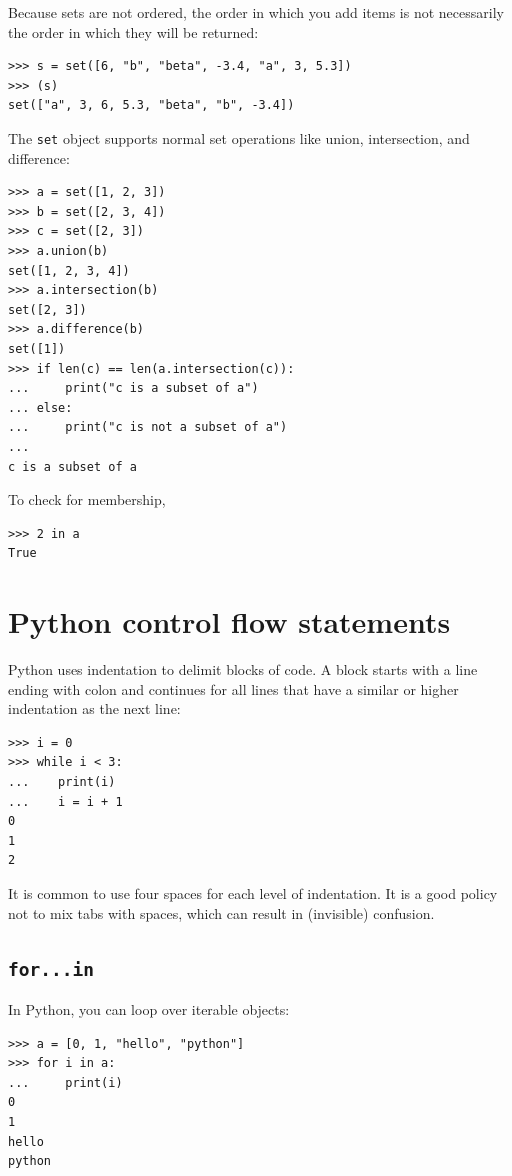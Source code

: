 \documentclass[justified, sixbynine]{tufte-book}
\def\ft{\small\tt}
\theoremstyle{plain}%
\newtheorem * {corollary}{Corollary}
\theoremstyle{definition}
\theoremstyle{remark}
\newtheorem * {remark}{Remark}
\newtheorem * {note}{Note}
\begin{document}
\begin{fullwidth}
Because sets are not ordered, the order in which you add items is not necessarily the order in which they will be returned:

\begin{lstlisting}
>>> s = set([6, "b", "beta", -3.4, "a", 3, 5.3])
>>> (s)
set(["a", 3, 6, 5.3, "beta", "b", -3.4])
\end{lstlisting}


The {\ft set} object supports normal set operations like union, intersection, and difference:

\begin{lstlisting}
>>> a = set([1, 2, 3])
>>> b = set([2, 3, 4])
>>> c = set([2, 3])
>>> a.union(b)
set([1, 2, 3, 4])
>>> a.intersection(b)
set([2, 3])
>>> a.difference(b)
set([1])
>>> if len(c) == len(a.intersection(c)):
...     print("c is a subset of a")
... else:
...     print("c is not a subset of a")
...
c is a subset of a
\end{lstlisting}

To check for membership, 

\begin{lstlisting}
>>> 2 in a
True
\end{lstlisting}

\goodbreak\section{Python control flow statements}

Python uses indentation to delimit blocks of code. A block starts with a line ending with colon and continues for all lines that have a similar or higher indentation as the next line:

\begin{lstlisting}
>>> i = 0
>>> while i < 3:
...    print(i)
...    i = i + 1
0
1
2
\end{lstlisting}

It is common to use four spaces for each level of indentation.
It is a good policy not to mix tabs with spaces, which can result in (invisible) confusion.

\goodbreak\subsection{{\ft for...in}}

In Python, you can loop over iterable objects:

\begin{lstlisting}
>>> a = [0, 1, "hello", "python"]
>>> for i in a:
...     print(i)
0
1
hello
python
\end{lstlisting}


\end{fullwidth}
\end{document}
